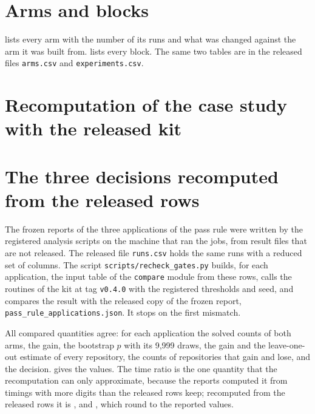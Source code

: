 \appendix

\section{Arms and blocks}\label{sec:app-arms}

 lists every arm with the number of its runs and what was changed against the arm it was built from.
 lists every block. The same two tables are in the released files \texttt{arms.csv} and
\texttt{experiments.csv}.





\section{Recomputation of the case study with the released kit}\label{sec:app-recompute}



\section{The three decisions recomputed from the released rows}\label{sec:app-recheck}



The frozen reports of the three applications of the pass rule were written by the registered analysis scripts on the
machine that ran the jobs, from result files that are not released. The released file \texttt{runs.csv} holds the
same runs with a reduced set of columns. The script \texttt{scripts/recheck\_gates.py} builds, for each application,
the input table of the \texttt{compare} module from these rows, calls the routines of the kit at tag
\texttt{v0.4.0} with the registered thresholds and seed, and compares the result with the released copy of the
frozen report, \texttt{pass\_rule\_applications.json}. It stops on the first mismatch.

All \RecheckQuantities{} compared quantities agree: for each application the solved counts of both arms, the gain,
the bootstrap $p$ with its 9,999 draws, the gain and the leave-one-out estimate of every repository, the counts of
repositories that gain and lose, and the decision.  gives the values. The time ratio is the one
quantity that the recomputation can only approximate, because the reports computed it from timings with more
digits than the released rows keep; recomputed from the released rows it is \RecheckTimeOne{}, \RecheckTimeTwo{} and
\RecheckTimeThree{}, which round to the reported values.

